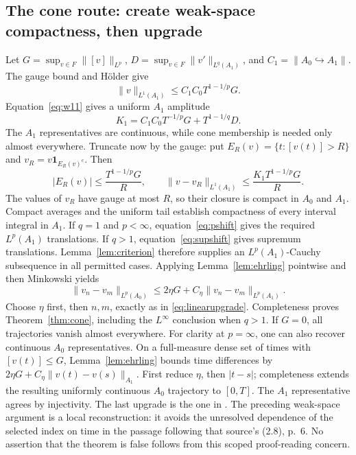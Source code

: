 \documentclass[12pt,reqno]{amsart}
\begin{document}
\subsection{The cone route: create weak-space compactness, then upgrade}
Let $G=\sup_{v\in F}\|[v]\|_{L^p}$, $D=\sup_{v\in F}\|v'\|_{L^q(A_1)}$, and $C_1=\|A_0\hookrightarrow A_1\|$. The gauge bound and H\"older give
\[
\|v\|_{L^1(A_1)}\le C_1C_0T^{1-1/p}G.
\]
Equation~\eqref{eq:w11} gives a uniform $A_1$ amplitude
\begin{equation}\label{eq:coneamp}
K_1=C_1C_0T^{-1/p}G+T^{1-1/q}D.
\end{equation}
The $A_1$ representatives are continuous, while cone membership is needed only almost everywhere.
Truncate now by the gauge: put $E_R(v)=\{t:[v(t)]>R\}$ and $v_R=v\mathbf1_{E_R(v)^c}$. Then
\begin{equation}\label{eq:conetail}
|E_R(v)|\le\frac{T^{1-1/p}G}{R},\qquad
\|v-v_R\|_{L^1(A_1)}\le\frac{K_1T^{1-1/p}G}{R}.
\end{equation}
The values of $v_R$ have gauge at most $R$, so their closure is compact in $A_0$ and $A_1$. Compact averages and the uniform tail establish compactness of every interval integral in $A_1$.
If $q=1$ and $p<\infty$, equation~\eqref{eq:pshift} gives the required $L^p(A_1)$ translations. If $q>1$, equation~\eqref{eq:supshift} gives supremum translations. Lemma~\ref{lem:criterion} therefore supplies an $L^p(A_1)$-Cauchy subsequence in all permitted cases.
Applying Lemma~\ref{lem:ehrling} pointwise and then Minkowski yields
\begin{equation}\label{eq:coneupgrade}
\|v_n-v_m\|_{L^p(A_0)}\le2\eta G+C_\eta\|v_n-v_m\|_{L^p(A_1)}.
\end{equation}
Choose $\eta$ first, then $n,m$, exactly as in \eqref{eq:linearupgrade}. Completeness proves Theorem~\ref{thm:cone}, including the $L^\infty$ conclusion when $q>1$. If $G=0$, all trajectories vanish almost everywhere.
For clarity at $p=\infty$, one can also recover continuous $A_0$ representatives. On a full-measure dense set of times with $[v(t)]\le G$, Lemma~\ref{lem:ehrling} bounds time differences by $2\eta G+C_\eta\|v(t)-v(s)\|_{A_1}$. First reduce $\eta$, then $|t-s|$; completeness extends the resulting uniformly continuous $A_0$ trajectory to $[0,T]$. The $A_1$ representative agrees by injectivity.
The last upgrade is the one in \cite[equation (2.22), pp.~12--13]{S-barrett-suli}. The preceding weak-space argument is a local reconstruction: it avoids the unresolved dependence of the selected index on time in the passage following that source's (2.8), p.~6. No assertion that the theorem is false follows from this scoped proof-reading concern.
\end{document}
